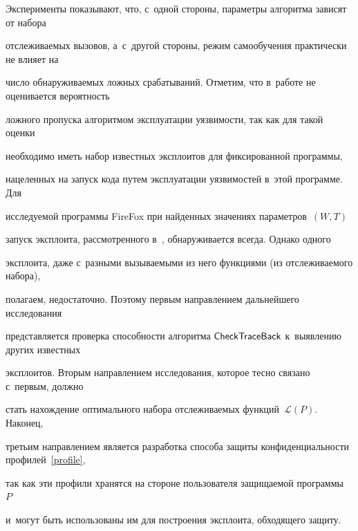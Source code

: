 Эксперименты показывают, что, с~одной стороны, па\-ра\-мет\-ры алгоритма зависят от набора 

от\-сле\-жи\-ва\-емых вызовов, а~с~другой стороны, режим самообучения практически не влияет на 

чис\-ло обна\-ру\-жи\-ва\-емых ложных срабатываний. Отметим, что в~работе не оценивается ве\-ро\-ят\-ность 

лож\-но\-го про\-пус\-ка алгоритмом эксплуатации уяз\-ви\-мости, так как для такой оцен\-ки 

необходимо иметь набор известных эксплоитов для фиксированной программы, 

нацеленных на запуск кода путем эксплуатации уязвимостей в~этой программе. Для 

исследуемой программы {\sf FireFox} при найденных значениях па\-ра\-мет\-ров~$(W,T)$ 

запуск эксплоита, рассмотренного в~\cite{Kos2020}, обнаруживается всегда. Однако одного 

эксплоита, даже с~разными вы\-зы\-ва\-емы\-ми из него функциями (из от\-сле\-жи\-ва\-емо\-го набора), 

полагаем, недостаточно. Поэтому первым на\-прав\-ле\-ни\-ем дальнейшего исследования 

пред\-став\-ля\-ет\-ся проверка спо\-соб\-ности алгоритма ${\sf CheckTraceBack}$ к~вы\-яв\-ле\-нию других известных 

эксплоитов. Вторым направлением исследования, которое тес\-но связано с~пер\-вым, должно 

стать нахождение оптимального набора отслеживаемых функций~$\mathcal{L}(P)$. Наконец, 

третьим на\-прав\-ле\-ни\-ем является разработка способа защиты конфиденциальности профилей~\eqref{profile}, 

так как эти профили хранятся на стороне пользователя за\-щи\-ща\-емой программы~$P$ 

и~могут быть использованы им для построения эксплоита, обходящего защиту.






